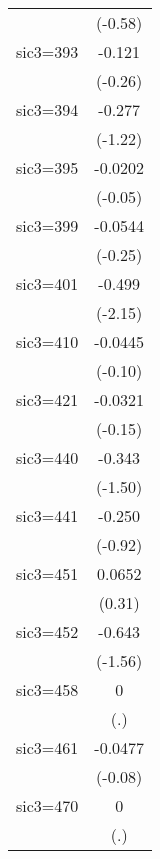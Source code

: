 \begin{table}[htbp]
\begin{tabular*}{0.8\hsize}{@{\hskip\tabcolsep\extracolsep\fill}l*{1}{c}}
                    &     (-0.58)         \\
\addlinespace
sic3=393            &      -0.121         \\
                    &     (-0.26)         \\
\addlinespace
sic3=394            &      -0.277         \\
                    &     (-1.22)         \\
\addlinespace
sic3=395            &     -0.0202         \\
                    &     (-0.05)         \\
\addlinespace
sic3=399            &     -0.0544         \\
                    &     (-0.25)         \\
\addlinespace
sic3=401            &      -0.499\sym{*}  \\
                    &     (-2.15)         \\
\addlinespace
sic3=410            &     -0.0445         \\
                    &     (-0.10)         \\
\addlinespace
sic3=421            &     -0.0321         \\
                    &     (-0.15)         \\
\addlinespace
sic3=440            &      -0.343         \\
                    &     (-1.50)         \\
\addlinespace
sic3=441            &      -0.250         \\
                    &     (-0.92)         \\
\addlinespace
sic3=451            &      0.0652         \\
                    &      (0.31)         \\
\addlinespace
sic3=452            &      -0.643         \\
                    &     (-1.56)         \\
\addlinespace
sic3=458            &           0         \\
                    &         (.)         \\
\addlinespace
sic3=461            &     -0.0477         \\
                    &     (-0.08)         \\
\addlinespace
sic3=470            &           0         \\
                    &         (.)         \\

\end{tabular*}
\end{table}
